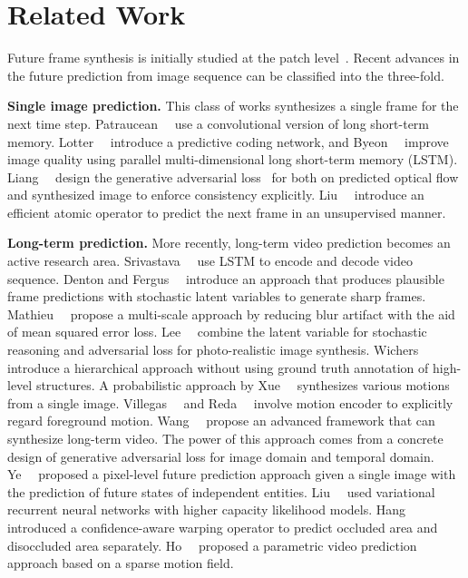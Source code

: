 \documentclass[10pt,twocolumn,letterpaper]{article}
\begin{document}
\section{Related Work}
Future frame synthesis is initially studied at the patch level~\cite{Sutskever2009}. Recent advances in the future prediction from image sequence can be classified into the three-fold.

\vspace{2mm}
\noindent\textbf{Single image prediction.}
This class of works synthesizes a single frame for the next time step. Patraucean~\etal~\cite{Patraucean2016} use a convolutional version of long short-term memory. Lotter~\etal~\cite{prednet} introduce a predictive coding network, and Byeon~\etal~\cite{Byeon2018} improve image quality using parallel multi-dimensional long short-term memory (LSTM). Liang~\etal~\cite{Liang2017} design the generative adversarial loss~\cite{Goodfellow2014} for both on predicted optical flow and synthesized image to enforce consistency explicitly. Liu~\etal~\cite{Liu2018} introduce an efficient atomic operator to predict the next frame in an unsupervised manner. 

\vspace{2mm}
\noindent\textbf{Long-term prediction.}
More recently, long-term video prediction becomes an active research area. Srivastava~\etal~\cite{Srivastava2015} use LSTM to encode and decode video sequence. Denton and Fergus~\etal~\cite{DentonFergus2018} introduce an approach that produces plausible frame predictions with stochastic latent variables to generate sharp frames. Mathieu~\etal~\cite{Mathieu2015} propose a multi-scale approach by reducing blur artifact with the aid of mean squared error loss.  Lee~\etal~\cite{Lee2018} combine the latent variable for stochastic reasoning and adversarial loss for photo-realistic image synthesis. Wichers~\etal~\cite{Wichers2018} introduce a hierarchical approach without using ground truth annotation of high-level structures. A probabilistic approach by Xue~\etal~\cite{xue2016visual} synthesizes various motions from a single image. Villegas~\etal~\cite{villegas17mcnet} and Reda~\etal~\cite{Reda2018} involve motion encoder to explicitly regard foreground motion. Wang~\etal~\cite{Wang2018} propose an advanced framework that can synthesize long-term video. The power of this approach comes from a concrete design of generative adversarial loss for image domain and temporal domain. Ye~\etal~\cite{ye2019Compositional} proposed a pixel-level future prediction approach given a single image with the prediction of future states of independent entities. 
Liu~\etal~\cite{Liu2019VRNN} used variational recurrent neural networks with higher capacity likelihood models.
Hang~\etal~\cite{Hang2019Dis} introduced a confidence-aware warping operator to predict occluded area and disoccluded area separately.
Ho~\etal~\cite{Ho2019SMENET} proposed a parametric video prediction approach based on a sparse motion field.
\end{document}
